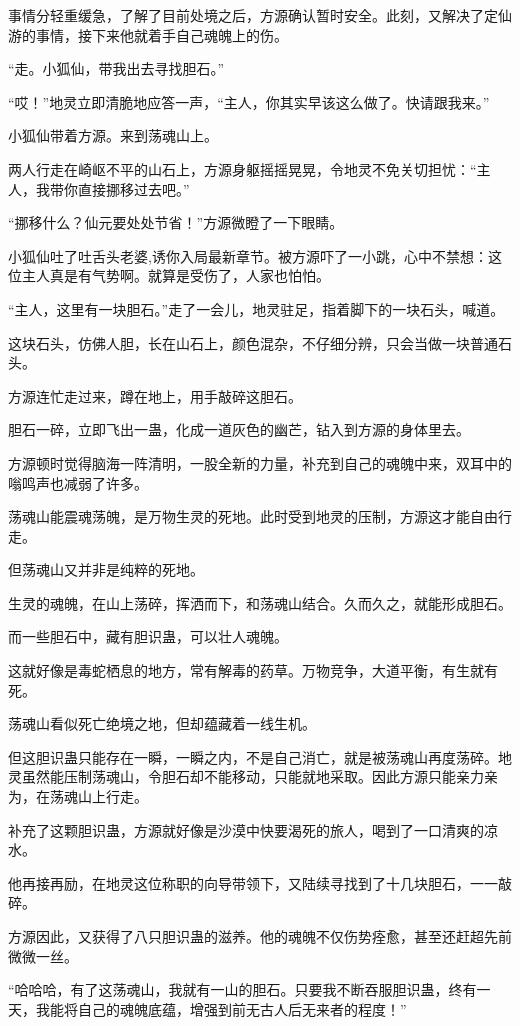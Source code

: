 \begin{this_body}
事情分轻重缓急，了解了目前处境之后，方源确认暂时安全。此刻，又解决了定仙游的事情，接下来他就着手自己魂魄上的伤。

“走。小狐仙，带我出去寻找胆石。”

“哎！”地灵立即清脆地应答一声，“主人，你其实早该这么做了。快请跟我来。”

小狐仙带着方源。来到荡魂山上。

两人行走在崎岖不平的山石上，方源身躯摇摇晃晃，令地灵不免关切担忧：“主人，我带你直接挪移过去吧。”

“挪移什么？仙元要处处节省！”方源微瞪了一下眼睛。

小狐仙吐了吐舌头老婆,诱你入局最新章节。被方源吓了一小跳，心中不禁想：这位主人真是有气势啊。就算是受伤了，人家也怕怕。

“主人，这里有一块胆石。”走了一会儿，地灵驻足，指着脚下的一块石头，喊道。

这块石头，仿佛人胆，长在山石上，颜色混杂，不仔细分辨，只会当做一块普通石头。

方源连忙走过来，蹲在地上，用手敲碎这胆石。

胆石一碎，立即飞出一蛊，化成一道灰色的幽芒，钻入到方源的身体里去。

方源顿时觉得脑海一阵清明，一股全新的力量，补充到自己的魂魄中来，双耳中的嗡鸣声也减弱了许多。

荡魂山能震魂荡魄，是万物生灵的死地。此时受到地灵的压制，方源这才能自由行走。

但荡魂山又并非是纯粹的死地。

生灵的魂魄，在山上荡碎，挥洒而下，和荡魂山结合。久而久之，就能形成胆石。

而一些胆石中，藏有胆识蛊，可以壮人魂魄。

这就好像是毒蛇栖息的地方，常有解毒的药草。万物竞争，大道平衡，有生就有死。

荡魂山看似死亡绝境之地，但却蕴藏着一线生机。

但这胆识蛊只能存在一瞬，一瞬之内，不是自己消亡，就是被荡魂山再度荡碎。地灵虽然能压制荡魂山，令胆石却不能移动，只能就地采取。因此方源只能亲力亲为，在荡魂山上行走。

补充了这颗胆识蛊，方源就好像是沙漠中快要渴死的旅人，喝到了一口清爽的凉水。

他再接再励，在地灵这位称职的向导带领下，又陆续寻找到了十几块胆石，一一敲碎。

方源因此，又获得了八只胆识蛊的滋养。他的魂魄不仅伤势痊愈，甚至还赶超先前微微一丝。

“哈哈哈，有了这荡魂山，我就有一山的胆石。只要我不断吞服胆识蛊，终有一天，我能将自己的魂魄底蕴，增强到前无古人后无来者的程度！”


\end{this_body}
